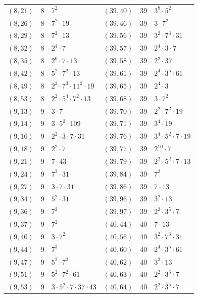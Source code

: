 \documentclass[11pt]{article}
\begin{document}
\begin{longtable}{@{}lrl@{\qquad}lrl@{}}
$(8,21)$ & 8 & $7^{2}$ & $(39,40)$ & 39 & $3^{8}\cdot 5^{2}$\\
$(8,26)$ & 8 & $7^{2}\cdot 19$ & $(39,46)$ & 39 & $3\cdot 7^{2}$\\
$(8,29)$ & 8 & $7^{2}\cdot 13$ & $(39,56)$ & 39 & $3^{2}\cdot 7^{3}\cdot 31$\\
$(8,32)$ & 8 & $2^{4}\cdot 7$ & $(39,57)$ & 39 & $2^{4}\cdot 3\cdot 7$\\
$(8,35)$ & 8 & $2^{6}\cdot 7\cdot 13$ & $(39,58)$ & 39 & $2^{2}\cdot 37$\\
$(8,42)$ & 8 & $5^{2}\cdot 7^{2}\cdot 13$ & $(39,61)$ & 39 & $2^{4}\cdot 3^{5}\cdot 61$\\
$(8,49)$ & 8 & $2^{2}\cdot 7^{3}\cdot 11^{2}\cdot 19$ & $(39,65)$ & 39 & $2^{4}\cdot 3$\\
$(8,53)$ & 8 & $2^{2}\cdot 5^{4}\cdot 7^{2}\cdot 13$ & $(39,68)$ & 39 & $3\cdot 7^{2}$\\
$(9,13)$ & 9 & $3\cdot 7$ & $(39,70)$ & 39 & $2^{2}\cdot 7^{2}\cdot 19$\\
$(9,14)$ & 9 & $3\cdot 5^{2}\cdot 109$ & $(39,71)$ & 39 & $3^{4}\cdot 19$\\
$(9,16)$ & 9 & $2^{2}\cdot 3\cdot 7\cdot 31$ & $(39,76)$ & 39 & $3^{4}\cdot 5^{2}\cdot 7\cdot 19$\\
$(9,18)$ & 9 & $2^{2}\cdot 7$ & $(39,77)$ & 39 & $2^{10}\cdot 7$\\
$(9,21)$ & 9 & $7\cdot 43$ & $(39,79)$ & 39 & $2^{2}\cdot 5^{2}\cdot 7\cdot 13$\\
$(9,24)$ & 9 & $7^{2}\cdot 31$ & $(39,84)$ & 39 & $7^{2}$\\
$(9,27)$ & 9 & $3\cdot 7\cdot 31$ & $(39,86)$ & 39 & $7\cdot 13$\\
$(9,34)$ & 9 & $5^{2}\cdot 31$ & $(39,96)$ & 39 & $3^{2}\cdot 13$\\
$(9,36)$ & 9 & $7^{2}$ & $(39,97)$ & 39 & $2^{2}\cdot 3^{5}\cdot 7$\\
$(9,37)$ & 9 & $7^{2}$ & $(40,44)$ & 40 & $7\cdot 13$\\
$(9,40)$ & 9 & $3\cdot 7^{2}$ & $(40,56)$ & 40 & $3^{2}\cdot 7^{3}\cdot 31$\\
$(9,44)$ & 9 & $7^{3}$ & $(40,60)$ & 40 & $2^{4}\cdot 3^{5}\cdot 61$\\
$(9,47)$ & 9 & $5^{2}\cdot 7^{2}$ & $(40,62)$ & 40 & $3^{2}\cdot 13$\\
$(9,51)$ & 9 & $5^{2}\cdot 7^{2}\cdot 61$ & $(40,63)$ & 40 & $2^{2}\cdot 3^{3}\cdot 7$\\
$(9,53)$ & 9 & $3\cdot 5^{2}\cdot 7\cdot 37\cdot 43$ & $(40,64)$ & 40 & $2^{2}\cdot 3^{5}\cdot 7$\\

\end{longtable}
\end{document}
